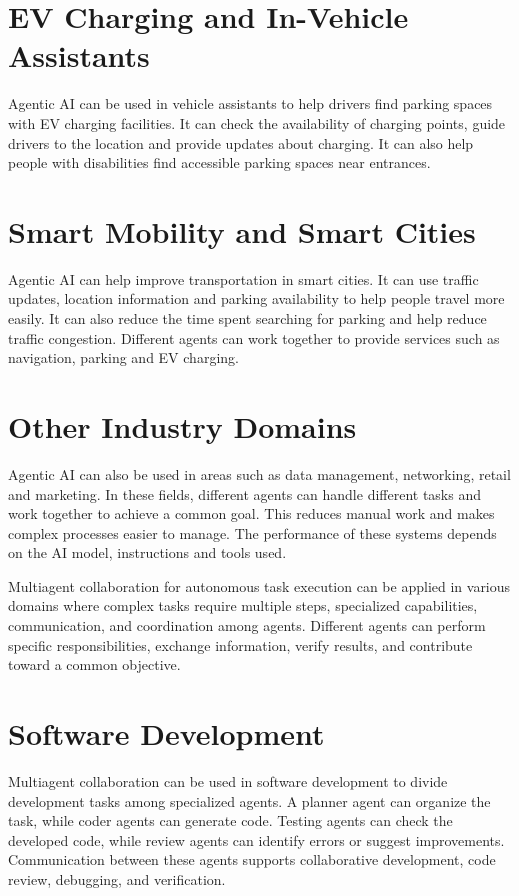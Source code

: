 \documentclass[12pt,a4paper]{report}
\begin{document}
\section{EV Charging and In-Vehicle Assistants}
Agentic AI can be used in vehicle assistants to help drivers find parking spaces with EV charging facilities. It can check the availability of charging points, guide drivers to the location and provide updates about charging. It can also help people with disabilities find accessible parking spaces near entrances.

\section{Smart Mobility and Smart Cities}
Agentic AI can help improve transportation in smart cities. It can use traffic updates, location information and parking availability to help people travel more easily. It can also reduce the time spent searching for parking and help reduce traffic congestion. Different agents can work together to provide services such as navigation, parking and EV charging.

\section{Other Industry Domains}
Agentic AI can also be used in areas such as data management, networking, retail and marketing. In these fields, different agents can handle different tasks and work together to achieve a common goal. This reduces manual work and makes complex processes easier to manage. The performance of these systems depends on the AI model, instructions and tools used.

Multiagent collaboration for autonomous task execution can be applied in various domains where complex tasks require multiple steps, specialized capabilities, communication, and coordination among agents. Different agents can perform specific responsibilities, exchange information, verify results, and contribute toward a common objective.

\section{Software Development}
Multiagent collaboration can be used in software development to divide development tasks among specialized agents. A planner agent can organize the task, while coder agents can generate code. Testing agents can check the developed code, while review agents can identify errors or suggest improvements. Communication between these agents supports collaborative development, code review, debugging, and verification.
\end{document}

